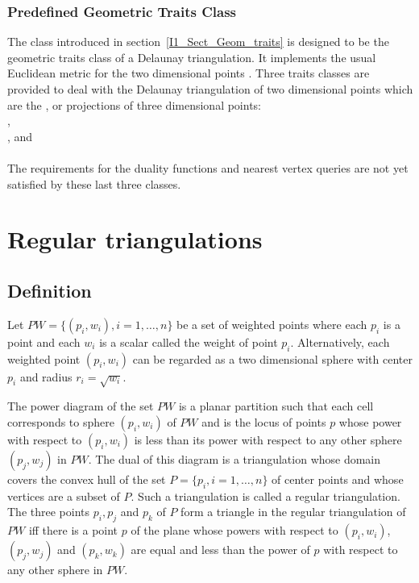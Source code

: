 \subsubsection{Predefined Geometric Traits Class}
The class 
introduced in section~\ref{I1_Sect_Geom_traits} is 
 designed to be 
the geometric traits class of a Delaunay triangulation.
It implements the usual Euclidean metric
for the  two dimensional points .
Three traits classes are provided to deal with
the Delaunay triangulation of two dimensional points which are
the ,  or  projections of three dimensional points:\\
,\\
, and\\
 \\
The requirements for the duality functions and nearest vertex
queries are not yet satisfied by
these last three classes.


\section{Regular triangulations}
\label{I1_Sect_Regular}
 
\subsection{Definition}
Let ${  PW} = \{(p_i, w_i), i = 1, \ldots , n \}$ be a set of 
weighted points where each $p_i$ is a point and each $w_i$
is a scalar called the weight of point $p_i$.
Alternatively, each weighted point $(p_i, w_i)$ can be regarded
as a two dimensional sphere with center $p_i$ and radius $r_i=\sqrt{w_i}$.

The power diagram of the set ${  PW}$ is a planar partition 
such that each cell corresponds to sphere $(p_i, w_i)$ of ${  PW}$
and is the locus of points  $p$ whose power with respect to $(p_i, w_i)$
is less than its power with respect to any other sphere $(p_j, w_j)$
in ${  PW}$. 
The dual of this diagram is a triangulation 
whose domain covers the convex hull of the set 
${  P}= \{ p_i, i = 1, \ldots , n \}$ of center points
and whose vertices are a subset of ${  P}$.
Such a triangulation is called a regular triangulation.
The  three points $p_i, p_j$ and $p_k$ of ${  P}$
form a triangle in the regular triangulation of ${  PW}$
iff there is a point $p$ of the plane whose
powers with respect to $(p_i, w_i)$, $(p_j, w_j)$
and $(p_k, w_k)$ are equal and less than the power of $p$
with respect to any other sphere in  ${  PW}$.

